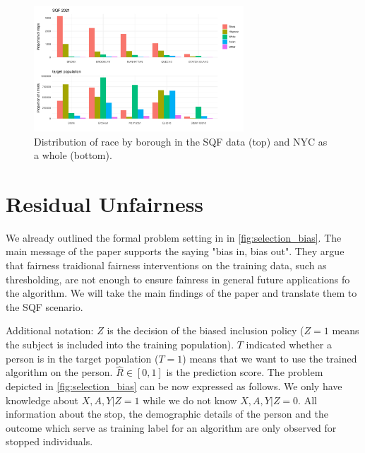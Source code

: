 \begin{figure}
    \centering
    \includegraphics[width=0.7\textwidth]{../figures/sqf_case_study_plot11.png}
    \caption {Distribution of race by borough in the SQF data (top) and NYC as a whole (bottom).}
    \label{fig:borough_race_distribution}
\end{figure}

\section{Residual Unfairness}
We already outlined the formal problem setting in \cite{kallus2018} in \autoref{fig:selection_bias}. The main message of the paper supports the saying "bias in, bias out". They argue that fairness traidional fairness interventions on the training data, such as thresholding, are not enough to ensure fainress in general future applications fo the algorithm. We will take the main findings of the paper and translate them to the SQF scenario.

Additional notation: $Z$ is the decision of the biased inclusion policy ($Z= 1$ means the subject is included into the training population). $T$ indicated whether a person is in the target population ($T = 1$) means that we want to use the trained algorithm on the person. $\hat{R} \in [0,1]$ is the prediction score.
The problem depicted in \autoref{fig:selection_bias} can be now expressed as follows. We only have knowledge about $X, A, Y | Z = 1$ while we do not know $X, A, Y | Z = 0$. All information about the stop, the demographic details of the person and the outcome which serve as training label for an algorithm are only observed for stopped individuals.

